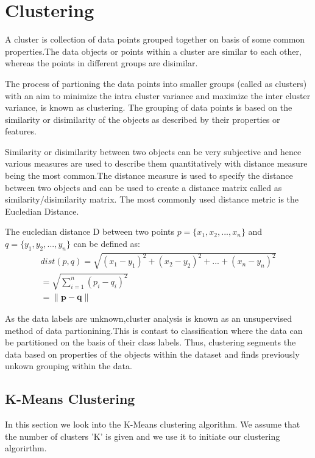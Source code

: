 \section{Clustering}
A cluster is collection of data points grouped together on basis of some common properties.The data objects or points within a cluster are similar to each other, whereas the points in different groups are disimilar.

The process of partioning the data points into smaller groups (called as clusters) with an aim to minimize the intra cluster variance and maximize the inter cluster variance, is known as clustering. The grouping of data points is based on the similarity or disimilarity of the objects as described by their properties or features.

Similarity or disimilarity between two objects can be very subjective and hence various measures are used to describe them quantitatively with distance measure being the most common.The distance measure is used to specify the distance between two objects and can be used to create a distance matrix called as similarity/disimilarity matrix. The most commonly used distance metric is the Eucledian Distance.

The eucledian distance D between two points $p =\{x_1, x_2, ... , x_n\}$ and $q =\{y_1, y_2, ... , y_n\}$ can be defined as:
\begin{equation}
\begin{split}
dist(p,q) =  \sqrt{(x_1 - y_1)^2 + (x_2 - y_2)^2 + ... +(x_n - y_n)^2 } \\
		 =  \sqrt{\sum_{i=1}^{n}(p_i - q_i)^2} \\
		 = \lVert \mathbf{p-q} \rVert
\end{split}
\end{equation}

As the data labels are unknown,cluster analysis is known as an unsupervised method of data partionining.This is contast to classification where the data can be partitioned on the basis of their class labels. Thus, clustering segments the data based on properties of the objects within the dataset and finds previously unkown grouping within the data.

\subsection{K-Means Clustering}
In this section we look into the K-Means clustering algorithm. We assume that the number of clusters 'K' is given and we use it to initiate our clustering algorirthm. 

